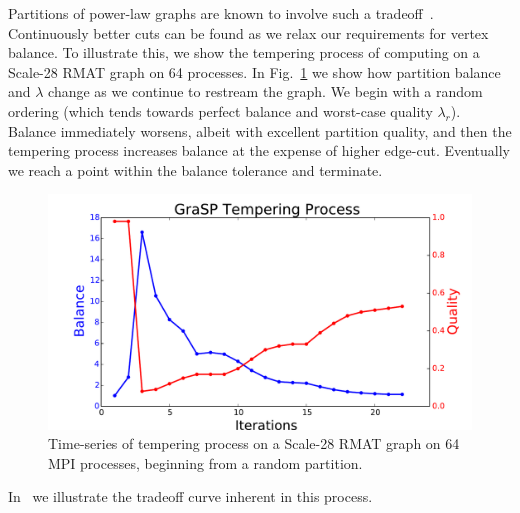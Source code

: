 Partitions of power-law graphs are known to involve such a tradeoff~\cite{Lang04findinggood}. Continuously better cuts can be found as we relax our requirements for vertex balance. To illustrate this, we show the tempering process of \ourmethod computing on a Scale-28 RMAT graph on 64 processes. In Fig.~\ref{fig:process} we show how partition balance and $\lambda$ change as we continue to restream the graph. We begin with a random ordering (which tends towards perfect balance and worst-case quality $\lambda_r$). Balance immediately worsens, albeit with excellent partition quality, and then the tempering process increases balance at the expense of higher edge-cut. Eventually we reach a point within the balance tolerance and terminate. 

\begin{figure}[t!]
\centering
\includegraphics[width=0.9\columnwidth] {figures/tradeoff_process.pdf}
\caption[Caption for]{ Time-series of tempering process on a Scale-28 RMAT graph on 64 MPI processes, beginning from a random partition. }
\label{fig:process}
\end{figure}

In~ we illustrate the tradeoff curve inherent in this process.

